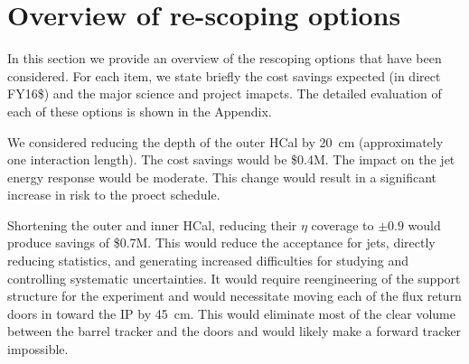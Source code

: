 
\section{Overview of re-scoping options}
\label{sec:overview-re-scoping}

In this section we provide an overview of the rescoping options that
have been considered.  For each item, we state briefly the cost
savings expected (in direct FY16\$) and the major science and project
imapcts.  The detailed evaluation of each of these options is shown in
the Appendix.

We considered reducing the depth of the outer HCal by 20~cm
(approximately one interaction length).  The cost savings would be
\$0.4M.  The impact on the jet energy response would be moderate.
This change would result in a significant increase in risk to the
proect schedule. 

Shortening the outer and inner HCal, reducing their $\eta$ coverage to
$\pm0.9$ would produce savings of \$0.7M.  This would reduce the
acceptance for jets, directly reducing statistics, and generating
increased difficulties for studying and controlling systematic
uncertainties.  It would require reengineering of the support
structure for the experiment and would necessitate moving each of the flux
return doors in toward the IP by 45~cm.  This would eliminate most of
the clear volume between the barrel tracker and the doors and would
likely make a forward tracker impossible.


